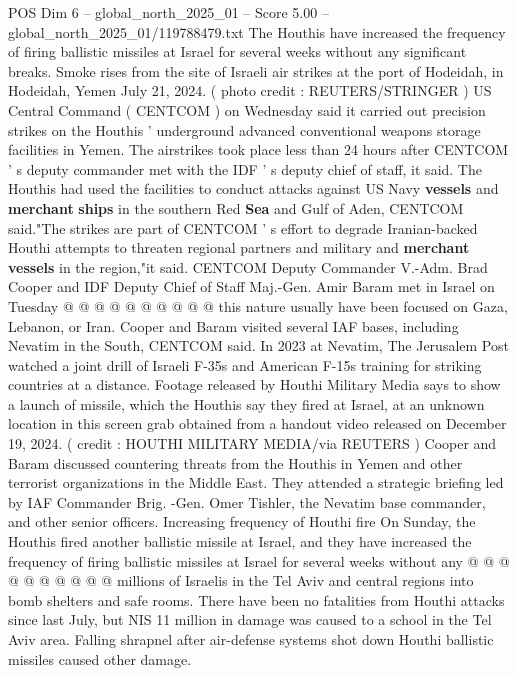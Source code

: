 \begin{textsample}{POS Dim 6 – global\_north\_2025\_01 – Score 5.00 – global\_north\_2025\_01/119788479.txt}  \label{ex:f6_pos_280}
The Houthis have increased the frequency of firing ballistic missiles at Israel for several weeks without any significant breaks.
Smoke rises from the site of Israeli air strikes at the port of Hodeidah, in Hodeidah, Yemen July 21, 2024. ( photo credit : REUTERS/STRINGER ) US Central Command ( CENTCOM ) on Wednesday said it carried out precision strikes on the Houthis ' underground advanced conventional weapons storage facilities in Yemen.
The airstrikes took place less than 24 hours after CENTCOM ' s deputy commander met with the IDF ' s deputy chief of staff, it said.
The Houthis had used the facilities to conduct attacks against US Navy \textbf{vessels} and \textbf{merchant} \textbf{ships} in the southern Red \textbf{Sea} and Gulf of Aden, CENTCOM said."The strikes are part of CENTCOM ' s effort to degrade Iranian-backed Houthi attempts to threaten regional partners and military and \textbf{merchant} \textbf{vessels} in the region,"it said.
CENTCOM Deputy Commander V.-Adm.
Brad Cooper and IDF Deputy Chief of Staff Maj.-Gen.
Amir Baram met in Israel on Tuesday @ @ @ @ @ @ @ @ @ @ this nature usually have been focused on Gaza, Lebanon, or Iran.
Cooper and Baram visited several IAF bases, including Nevatim in the South, CENTCOM said.
In 2023 at Nevatim, The Jerusalem Post watched a joint drill of Israeli F-35s and American F-15s training for striking countries at a distance.
Footage released by Houthi Military Media says to show a launch of missile, which the Houthis say they fired at Israel, at an unknown location in this screen grab obtained from a handout video released on December 19, 2024. ( credit : HOUTHI MILITARY MEDIA/via REUTERS ) Cooper and Baram discussed countering threats from the Houthis in Yemen and other terrorist organizations in the Middle East.
They attended a strategic briefing led by IAF Commander Brig. -Gen.
Omer Tishler, the Nevatim base commander, and other senior officers.
Increasing frequency of Houthi fire On Sunday, the Houthis fired another ballistic missile at Israel, and they have increased the frequency of firing ballistic missiles at Israel for several weeks without any @ @ @ @ @ @ @ @ @ @ millions of Israelis in the Tel Aviv and central regions into bomb shelters and safe rooms.
There have been no fatalities from Houthi attacks since last July, but NIS 11 million in damage was caused to a school in the Tel Aviv area.
Falling shrapnel after air-defense systems shot down Houthi ballistic missiles caused other damage.

\end{textsample}
